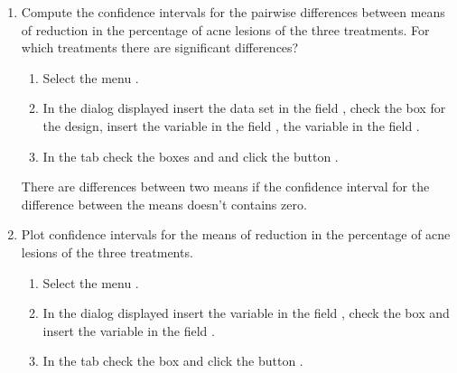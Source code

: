 \begin {enumerate}[leftmargin=*]
\begin{enumerate}
\item Compute the confidence intervals for the pairwise differences between means of reduction in the percentage of acne
lesions of the three treatments.
For which treatments there are significant differences?
\begin{indication}
\begin{enumerate}
\item Select the menu .
\item In the dialog displayed insert the data set  in the field , check the box
 for the design, insert the variable  in the field , the variable  in the field .
\item In the  tab check the boxes  and  and click the button .
\end{enumerate}
There are differences between two means if the confidence interval for the difference between the means doesn't contains
zero.
\end{indication}

\item Plot confidence intervals for the means of reduction in the percentage of acne lesions of the three
treatments. 
\begin{indication}
\begin{enumerate}
\item Select the menu .
\item In the dialog displayed insert the variable  in the field , check the box
 and insert the variable  in the field .
\item In the  tab check the box  and click the button
.
\end{enumerate}
\end{indication}
\end{enumerate}



\end{enumerate}
